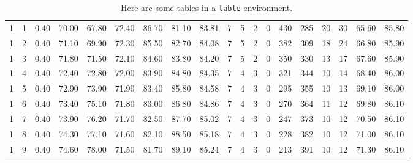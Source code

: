 \begin{table}
{{\begin{tabular}{rrrrrrrrrrrrrrrrrrr}
    \midrule
           1 &         1 &       0.40 & 70.00 & 67.80 & 72.40 & 86.70 & 81.10 & 83.81 &   7 &   5 &   2 &   0 & 430 & 285 &   20 &  30 & 65.60 & 85.80 \\
           1 &         2 &       0.40 & 71.10 & 69.90 & 72.30 & 85.50 & 82.70 & 84.08 &   7 &   5 &   2 &   0 & 382 & 309 &   18 &  24 & 66.80 & 85.90 \\
           1 &         3 &       0.40 & 71.80 & 71.50 & 72.10 & 84.60 & 83.80 & 84.20 &   7 &   5 &   2 &   0 & 350 & 330 &   13 &  17 & 67.60 & 85.90 \\
           1 &         4 &       0.40 & 72.40 & 72.80 & 72.00 & 83.90 & 84.80 & 84.35 &   7 &   4 &   3 &   0 & 321 & 344 &   10 &  14 & 68.40 & 86.00 \\
           1 &         5 &       0.40 & 72.90 & 73.90 & 71.90 & 83.40 & 85.80 & 84.58 &   7 &   4 &   3 &   0 & 295 & 355 &   10 &  13 & 69.10 & 86.00 \\
           1 &         6 &       0.40 & 73.40 & 75.10 & 71.80 & 83.00 & 86.80 & 84.86 &   7 &   4 &   3 &   0 & 270 & 364 &   11 &  12 & 69.80 & 86.10 \\
           1 &         7 &       0.40 & 73.90 & 76.20 & 71.70 & 82.50 & 87.70 & 85.02 &   7 &   4 &   3 &   0 & 247 & 373 &   10 &  12 & 70.50 & 86.10 \\
           1 &         8 &       0.40 & 74.30 & 77.10 & 71.60 & 82.10 & 88.50 & 85.18 &   7 &   4 &   3 &   0 & 228 & 382 &   10 &  12 & 71.00 & 86.10 \\
           1 &         9 &       0.40 & 74.60 & 78.00 & 71.50 & 81.70 & 89.10 & 85.24 &   7 &   4 &   3 &   0 & 213 & 391 &   10 &  12 & 71.30 & 86.10 \\
    \bottomrule
    \end{tabular}
    }
  }
  \caption{Here are some tables in a \texttt{table} environment.}%
  \label{tbl:table}%
\end{table}
